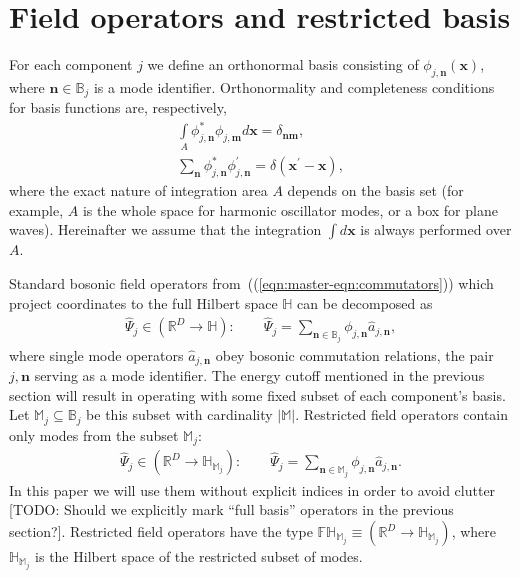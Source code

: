 \documentclass[12pt,aip,jmp,amssymb,amsmath]{revtex4-1}
\begin{document}
\section{Field operators and restricted basis}
\label{sec:func-operators}

For each component $j$ we define an orthonormal basis consisting of $\phi_{j,\boldsymbol{n}}(\boldsymbol{x})$, where $\boldsymbol{n} \in \mathbb{B}_j$ is a mode identifier.
Orthonormality and completeness conditions for basis functions are, respectively,
\begin{align}
    \int\limits_A \phi_{j,\boldsymbol{n}}^* \phi_{j,\boldsymbol{m}} d\boldsymbol{x} = \delta_{\boldsymbol{n}\boldsymbol{m}}, \\
    \sum_{\boldsymbol{n}} \phi_{j,\boldsymbol{n}}^* \phi_{j,\boldsymbol{n}}^\prime = \delta(\boldsymbol{x}^\prime - \boldsymbol{x}),
\end{align}
where the exact nature of integration area $A$ depends on the basis set (for example, $A$ is the whole space for harmonic oscillator modes, or a box for plane waves).
Hereinafter we assume that the integration $\int d\boldsymbol{x}$ is always performed over $A$.

Standard bosonic field operators from~((\ref{eqn:master-eqn:commutators})) which project coordinates to the full Hilbert space $\mathbb{H}$ can be decomposed as
\begin{equation}\begin{split}
    \hat{\Psi}_j \in (\mathbb{R}^D \rightarrow \mathbb{H}): \qquad
    \hat{\Psi}_j = \sum_{\boldsymbol{n} \in \mathbb{B}_j} \phi_{j,\boldsymbol{n}} \hat{a}_{j,\boldsymbol{n}},
\end{split}\end{equation}
where single mode operators $\hat{a}_{j,\boldsymbol{n}}$ obey bosonic commutation relations, the pair $j,\boldsymbol{n}$ serving as a mode identifier.
The energy cutoff mentioned in the previous section will result in operating with some fixed subset of each component's basis.
Let $\mathbb{M}_j \subseteq \mathbb{B}_j$ be this subset with cardinality $|\mathbb{M}|$.
Restricted field operators contain only modes from the subset $\mathbb{M}_j$:
\begin{equation}\begin{split}
    \hat{\Psi}_j \in (\mathbb{R}^D \rightarrow \mathbb{H}_{\mathbb{M}_j}): \qquad
    \hat{\Psi}_j = \sum_{\boldsymbol{n} \in \mathbb{M}_j} \phi_{j,\boldsymbol{n}} \hat{a}_{j,\boldsymbol{n}}.
\end{split}\end{equation}
In this paper we will use them without explicit indices in order to avoid clutter [TODO: Should we explicitly mark ``full basis'' operators in the previous section?].
Restricted field operators have the type $\mathbb{FH}_{\mathbb{M}_j} \equiv (\mathbb{R}^D \rightarrow \mathbb{H}_{\mathbb{M}_j})$, where $\mathbb{H}_{\mathbb{M}_j}$ is the Hilbert space of the restricted subset of modes.
\end{document}
